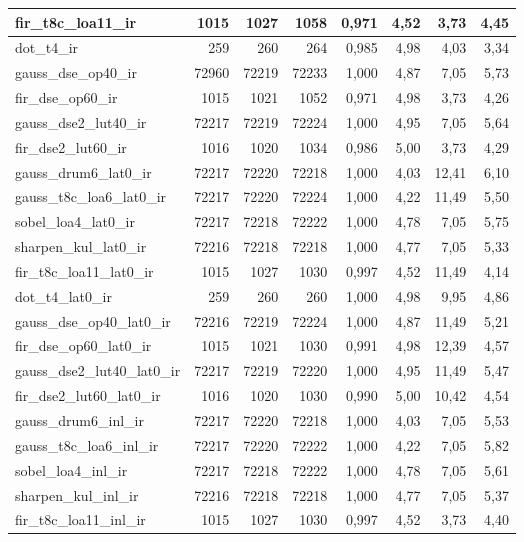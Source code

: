 \begin{table}[htbp]
\begin{tabular}{|l|r|r|r|r|r|r|r|}
fir\_t8c\_loa11\_ir & 1015 & 1027 & 1058 & 0,971 & 4,52 & 3,73 & 4,45 \\ \hline
dot\_t4\_ir & 259 & 260 & 264 & 0,985 & 4,98 & 4,03 & 3,34 \\ \hline
gauss\_dse\_op40\_ir & 72960 & 72219 & 72233 & 1,000 & 4,87 & 7,05 & 5,73 \\ \hline
fir\_dse\_op60\_ir & 1015 & 1021 & 1052 & 0,971 & 4,98 & 3,73 & 4,26 \\ \hline
gauss\_dse2\_lut40\_ir & 72217 & 72219 & 72224 & 1,000 & 4,95 & 7,05 & 5,64 \\ \hline
fir\_dse2\_lut60\_ir & 1016 & 1020 & 1034 & 0,986 & 5,00 & 3,73 & 4,29 \\ \hline
gauss\_drum6\_lat0\_ir & 72217 & 72220 & 72218 & 1,000 & 4,03 & 12,41 & 6,10 \\ \hline
gauss\_t8c\_loa6\_lat0\_ir & 72217 & 72220 & 72224 & 1,000 & 4,22 & 11,49 & 5,50 \\ \hline
sobel\_loa4\_lat0\_ir & 72217 & 72218 & 72222 & 1,000 & 4,78 & 7,05 & 5,75 \\ \hline
sharpen\_kul\_lat0\_ir & 72216 & 72218 & 72218 & 1,000 & 4,77 & 7,05 & 5,33 \\ \hline
fir\_t8c\_loa11\_lat0\_ir & 1015 & 1027 & 1030 & 0,997 & 4,52 & 11,49 & 4,14 \\ \hline
dot\_t4\_lat0\_ir & 259 & 260 & 260 & 1,000 & 4,98 & 9,95 & 4,86 \\ \hline
gauss\_dse\_op40\_lat0\_ir & 72216 & 72219 & 72224 & 1,000 & 4,87 & 11,49 & 5,21 \\ \hline
fir\_dse\_op60\_lat0\_ir & 1015 & 1021 & 1030 & 0,991 & 4,98 & 12,39 & 4,57 \\ \hline
gauss\_dse2\_lut40\_lat0\_ir & 72217 & 72219 & 72220 & 1,000 & 4,95 & 11,49 & 5,47 \\ \hline
fir\_dse2\_lut60\_lat0\_ir & 1016 & 1020 & 1030 & 0,990 & 5,00 & 10,42 & 4,54 \\ \hline
gauss\_drum6\_inl\_ir & 72217 & 72220 & 72218 & 1,000 & 4,03 & 7,05 & 5,53 \\ \hline
gauss\_t8c\_loa6\_inl\_ir & 72217 & 72220 & 72222 & 1,000 & 4,22 & 7,05 & 5,82 \\ \hline
sobel\_loa4\_inl\_ir & 72217 & 72218 & 72222 & 1,000 & 4,78 & 7,05 & 5,61 \\ \hline
sharpen\_kul\_inl\_ir & 72216 & 72218 & 72218 & 1,000 & 4,77 & 7,05 & 5,37 \\ \hline
fir\_t8c\_loa11\_inl\_ir & 1015 & 1027 & 1030 & 0,997 & 4,52 & 3,73 & 4,40 \\ \hline

\end{tabular}
\end{table}
